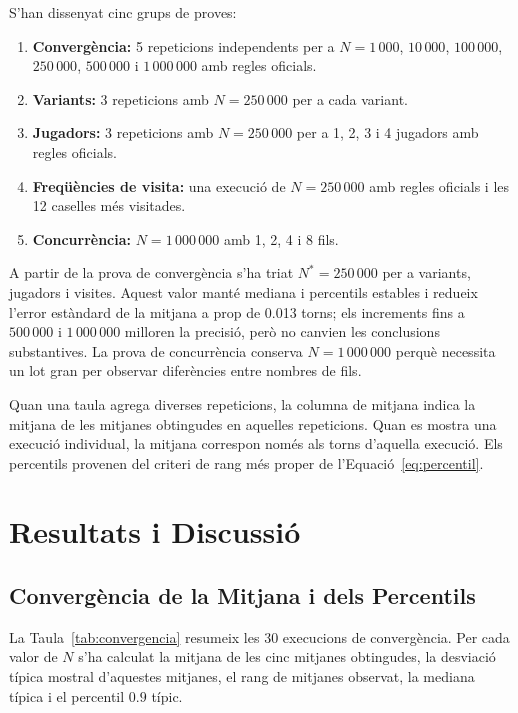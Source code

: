 \documentclass[conference,compsoc]{IEEEtran}
\begin{document}
S'han dissenyat cinc grups de proves:
\begin{enumerate}
    \item \textbf{Convergència:} 5 repeticions independents per a $N=1\,000$,
    $10\,000$, $100\,000$, $250\,000$, $500\,000$ i $1\,000\,000$ amb regles
    oficials.
    \item \textbf{Variants:} 3 repeticions amb $N=250\,000$ per a cada variant.
    \item \textbf{Jugadors:} 3 repeticions amb $N=250\,000$ per a 1, 2, 3 i 4
    jugadors amb regles oficials.
    \item \textbf{Freqüències de visita:} una execució de $N=250\,000$ amb regles
    oficials i les 12 caselles més visitades.
    \item \textbf{Concurrència:} $N=1\,000\,000$ amb 1, 2, 4 i 8 fils.
\end{enumerate}

A partir de la prova de convergència s'ha triat $N^*=250\,000$ per a variants,
jugadors i visites. Aquest valor manté mediana i percentils estables i redueix
l'error estàndard de la mitjana a prop de 0.013 torns; els increments fins a
$500\,000$ i $1\,000\,000$ milloren la precisió, però no canvien les conclusions
substantives. La prova de concurrència conserva $N=1\,000\,000$ perquè necessita un
lot gran per observar diferències entre nombres de fils.

Quan una taula agrega diverses repeticions, la columna de mitjana indica la mitjana
de les mitjanes obtingudes en aquelles repeticions. Quan es mostra una execució
individual, la mitjana correspon només als torns d'aquella execució. Els percentils
provenen del criteri de rang més proper de l'Equació~\ref{eq:percentil}.

\section{Resultats i Discussió}

\subsection{Convergència de la Mitjana i dels Percentils}

La Taula~\ref{tab:convergencia} resumeix les 30 execucions de convergència. Per
cada valor de $N$ s'ha calculat la mitjana de les cinc mitjanes obtingudes, la
desviació típica mostral d'aquestes mitjanes, el rang de mitjanes observat, la
mediana típica i el percentil $0.9$ típic.
\end{document}
